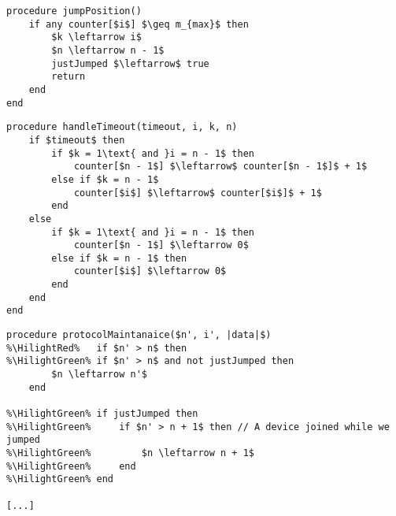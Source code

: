 \begin{lstlisting}[style=pseudocode,mathescape=true,float, label={lst:general_case4}, caption={If any counter is over its limit, then move to its position in the next frame and reduce the size of the network}] 
procedure jumpPosition()
	if any counter[$i$] $\geq m_{max}$ then
		$k \leftarrow i$
		$n \leftarrow n - 1$
		justJumped $\leftarrow$ true
		return
	end
end
\end{lstlisting}

\begin{lstlisting}[style=pseudocode,mathescape=true,float, label={lst:general_case3}, caption={This code handles counting how many times a given device has timed out. }]
procedure handleTimeout(timeout, i, k, n) 
	if $timeout$ then
		if $k = 1\text{ and }i = n - 1$ then
			counter[$n - 1$] $\leftarrow$ counter[$n - 1$]$ + 1$
		else if $k = n - 1$
			counter[$i$] $\leftarrow$ counter[$i$]$ + 1$
		end
	else 
		if $k = 1\text{ and }i = n - 1$ then
			counter[$n - 1$] $\leftarrow 0$
		else if $k = n - 1$ then
			counter[$i$] $\leftarrow 0$
		end
	end
end
\end{lstlisting}

\begin{lstlisting}[style=pseudocode, mathescape=true, float, label={lst:maintaniance1}, caption={Pseudocode changes to protocol maintaniance}, escapechar=\%] 
procedure protocolMaintanaice($n', i', |data|$)
%\HilightRed%	if $n' > n$ then
%\HilightGreen%	if $n' > n$ and not justJumped then
		$n \leftarrow n'$
	end

%\HilightGreen%	if justJumped then 
%\HilightGreen%		if $n' > n + 1$ then // A device joined while we jumped
%\HilightGreen%			$n \leftarrow n + 1$
%\HilightGreen%		end
%\HilightGreen%	end 

[...]
\end{lstlisting}  